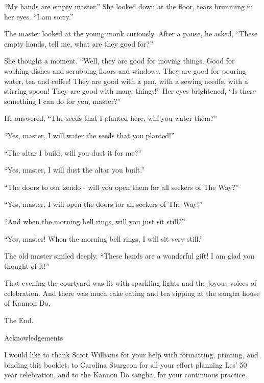 “My hands are empty master.” She looked down at the floor, tears brimming in her eyes. “I am sorry.” 

The master looked at the young monk curiously. After a pause, he asked, “These empty hands, tell me, what are they good for?”

She thought a moment. “Well, they are good for moving things. Good for washing dishes and scrubbing floors and windows. They are good for pouring water, tea and coffee! They are good with a pen, with a sewing needle, with a stirring spoon! They are good with many things!” Her eyes brightened, “Is there something I can do for you, master?”

He answered, “The seeds that I planted here, will you water them?”

“Yes, master, I will water the seeds that you planted!”

“The altar I build, will you dust it for me?”

“Yes, master, I will dust the altar you built.”

“The doors to our zendo - will you open them for all seekers of The Way?”

“Yes, master, I will open the doors for all seekers of The Way!”

“And when the morning bell rings, will you just sit still?”

“Yes, master! When the morning bell rings, I will sit very still.”

The old master smiled deeply. “These hands are a wonderful gift! I am glad you thought of it!”

That evening the courtyard was lit with sparkling lights and the joyous voices of celebration. And there was much cake eating and tea sipping at the sangha house of Kannon Do.

The End.
















Acknowledgements

I would like to thank Scott Williams for your help with formatting, printing, and binding this booklet, to Carolina Sturgeon for all your effort planning Les’ 50 year celebration, and to the Kannon Do sangha, for your continuous practice.




